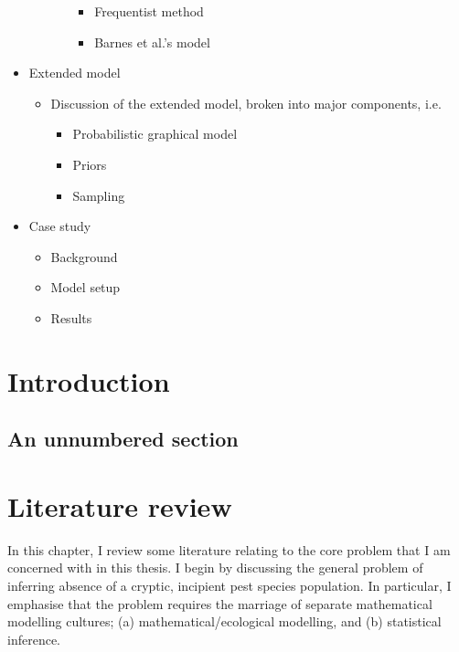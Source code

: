 \documentclass[
]{book}
\providecommand{\tightlist}{%
  \setlength{\itemsep}{0pt}\setlength{\parskip}{0pt}}
\begin{document}
\begin{itemize}
\begin{itemize}
\begin{itemize}
      \begin{itemize}
      \tightlist
      \item
        Frequentist method
      \item
        Barnes et al.'s model
      \end{itemize}
    \end{itemize}
  \end{itemize}
\item
  Extended model

  \begin{itemize}
  \tightlist
  \item
    Discussion of the extended model, broken into major components, i.e.

    \begin{itemize}
    \tightlist
    \item
      Probabilistic graphical model
    \item
      Priors
    \item
      Sampling
    \end{itemize}
  \end{itemize}
\item
  Case study

  \begin{itemize}
  \tightlist
  \item
    Background
  \item
    Model setup
  \item
    Results
  \end{itemize}
\end{itemize}

\hypertarget{introduction}{%
\chapter{Introduction}\label{introduction}}

\hypertarget{an-unnumbered-section}{%
\section*{An unnumbered section}\label{an-unnumbered-section}}

\hypertarget{lit-review}{%
\chapter{Literature review}\label{lit-review}}

In this chapter, I review some literature relating to the core problem that I am concerned with in this thesis. I begin by discussing the general problem of inferring absence of a cryptic, incipient pest species population. In particular, I emphasise that the problem requires the marriage of separate mathematical modelling cultures; (a) mathematical/ecological modelling, and (b) statistical inference.
\end{document}
